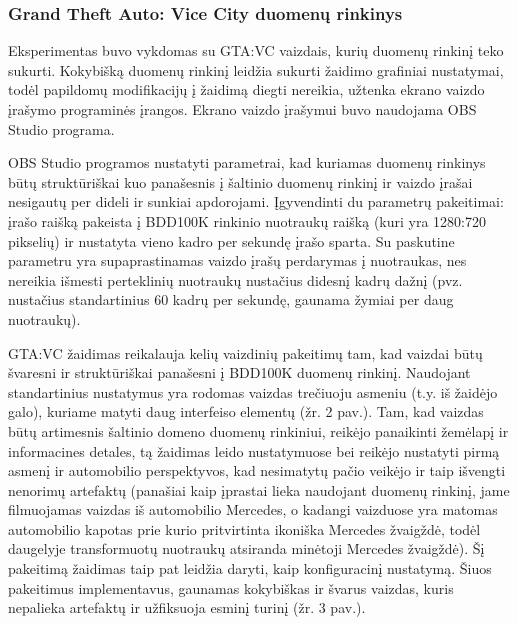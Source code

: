 \documentclass{VUMIFPSbakalaurinis}
\begin{document}
        \subsubsection{Grand Theft Auto: Vice City duomenų rinkinys}
            Eksperimentas buvo vykdomas su GTA:VC vaizdais, kurių duomenų rinkinį teko sukurti. Kokybišką duomenų rinkinį leidžia sukurti žaidimo grafiniai nustatymai, todėl papildomų modifikacijų į žaidimą diegti nereikia, užtenka ekrano vaizdo įrašymo programinės įrangos. Ekrano vaizdo įrašymui buvo naudojama OBS Studio programa.
            
            OBS Studio programos nustatyti parametrai, kad kuriamas duomenų rinkinys būtų struktūriškai kuo panašesnis į šaltinio duomenų rinkinį ir vaizdo įrašai nesigautų per dideli ir sunkiai apdorojami. Įgyvendinti du parametrų pakeitimai: įrašo raišką pakeista į BDD100K rinkinio nuotraukų raišką (kuri yra 1280:720 pikselių) ir nustatyta vieno kadro per sekundę įrašo sparta. Su paskutine parametru yra supaprastinamas vaizdo įrašų perdarymas į nuotraukas, nes nereikia išmesti perteklinių nuotraukų nustačius didesnį kadrų dažnį (pvz. nustačius standartinius 60 kadrų per sekundę, gaunama žymiai per daug nuotraukų).
            
            GTA:VC žaidimas reikalauja kelių vaizdinių pakeitimų tam, kad vaizdai būtų švaresni ir struktūriškai panašesni į BDD100K duomenų rinkinį. Naudojant standartinius nustatymus yra rodomas vaizdas trečiuoju asmeniu (t.y. iš žaidėjo galo), kuriame matyti daug interfeiso elementų (žr. 2 pav.). Tam, kad vaizdas būtų artimesnis šaltinio domeno duomenų rinkiniui, reikėjo panaikinti žemėlapį ir informacines detales, tą žaidimas leido nustatymuose bei reikėjo nustatyti pirmą asmenį ir automobilio perspektyvos, kad nesimatytų pačio veikėjo ir taip išvengti nenorimų artefaktų (panašiai kaip įprastai lieka naudojant \cite{DaimCityDaSe} duomenų rinkinį, jame filmuojamas vaizdas iš automobilio Mercedes, o kadangi vaizduose yra matomas automobilio kapotas prie kurio pritvirtinta ikoniška Mercedes žvaigždė, todėl daugelyje transformuotų nuotraukų atsiranda minėtoji Mercedes žvaigždė). Šį pakeitimą žaidimas taip pat leidžia daryti, kaip konfiguracinį nustatymą. Šiuos pakeitimus implementavus, gaunamas kokybiškas ir švarus vaizdas, kuris nepalieka artefaktų ir užfiksuoja esminį turinį (žr. 3 pav.).
\end{document}
